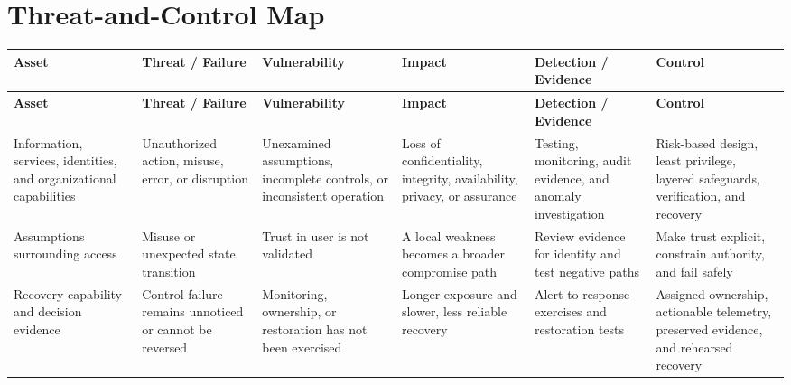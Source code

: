 \documentclass[11pt]{article}
\begin{document}
\section*{Threat-and-Control Map}
\begingroup\scriptsize\setlength{\tabcolsep}{2pt}
\begin{longtable}{>{\RaggedRight\arraybackslash}p{}>{\RaggedRight\arraybackslash}p{}>{\RaggedRight\arraybackslash}p{}>{\RaggedRight\arraybackslash}p{}>{\RaggedRight\arraybackslash}p{}>{\RaggedRight\arraybackslash}p{}}
\toprule\rowcolor{Navy}\color{white}\textbf{Asset} & \color{white}\textbf{Threat / Failure} & \color{white}\textbf{Vulnerability} & \color{white}\textbf{Impact} & \color{white}\textbf{Detection / Evidence} & \color{white}\textbf{Control}\\\midrule
\endfirsthead
\toprule\rowcolor{Navy}\color{white}\textbf{Asset} & \color{white}\textbf{Threat / Failure} & \color{white}\textbf{Vulnerability} & \color{white}\textbf{Impact} & \color{white}\textbf{Detection / Evidence} & \color{white}\textbf{Control}\\\midrule
\endhead
Information, services, identities, and organizational capabilities & Unauthorized action, misuse, error, or disruption & Unexamined assumptions, incomplete controls, or inconsistent operation & Loss of confidentiality, integrity, availability, privacy, or assurance & Testing, monitoring, audit evidence, and anomaly investigation & Risk-based design, least privilege, layered safeguards, verification, and recovery\\\midrule
Assumptions surrounding access & Misuse or unexpected state transition & Trust in user is not validated & A local weakness becomes a broader compromise path & Review evidence for identity and test negative paths & Make trust explicit, constrain authority, and fail safely\\\midrule
Recovery capability and decision evidence & Control failure remains unnoticed or cannot be reversed & Monitoring, ownership, or restoration has not been exercised & Longer exposure and slower, less reliable recovery & Alert-to-response exercises and restoration tests & Assigned ownership, actionable telemetry, preserved evidence, and rehearsed recovery\\\midrule
\bottomrule
\end{longtable}
\endgroup
\end{document}
